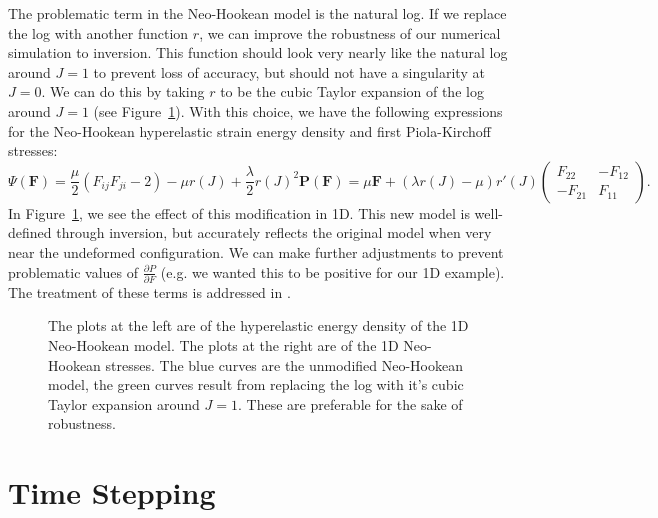 The problematic term in the Neo-Hookean model is the natural log. If we replace the log with another function $r$, we can improve the robustness of our numerical simulation to inversion. This function should look very nearly like the natural log around $J = 1$ to prevent loss of accuracy, but should not have a singularity at $J = 0$. We can do this by taking $r$ to be the cubic Taylor expansion of the log around $J = 1$ (see Figure~\ref{fig:inversion3}). With this choice, we have the following expressions for the Neo-Hookean hyperelastic strain energy density and first Piola-Kirchoff stresses:
\begin{subequations}
\begin{equation*}
\Psi \left( \mathbf{F} \right) = \frac{\mu}{2} \left( F_{ij} F_{ji} - 2 \right) - \mu r(J) + \frac{\lambda}{2} r(J)^2
\end{equation*}
\begin{equation*}
\mathbf{P} \left( \mathbf{F} \right) = \mu \mathbf{F} + \left( \lambda r(J) -\mu \right) r'(J) \begin{pmatrix} F_{22} & -F_{12} \\
-F_{21} & F_{11} \end{pmatrix}.
\end{equation*}
\end{subequations}
In Figure~\ref{fig:inversion3}, we see the effect of this modification in 1D. This new model is well-defined through inversion, but accurately reflects the original model when very near the undeformed configuration. We can make further adjustments to prevent problematic values of $\frac{\partial P}{\partial F}$ (e.g. we wanted this to be positive for our 1D example). The treatment of these terms is addressed in \cite{TeranQuas05}.

\begin{figure}
\caption{The plots at the left are of the hyperelastic energy density of the 1D Neo-Hookean model. The plots at the right are of the 1D Neo-Hookean stresses. The blue curves are the unmodified Neo-Hookean model, the green curves result from replacing the log with it's cubic Taylor expansion around $J = 1$. These are preferable for the sake of robustness.}
\label{fig:inversion3}
\end{figure}

\section*{Time Stepping}


